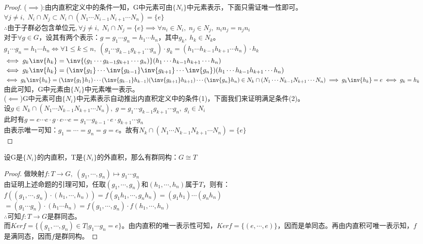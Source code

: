 \begin{proof}
($\implies$):由内直积定义中的条件一知，G中元素可由$\{N_i\}$中元素表示，下面只需证唯一性即可。\\
$\forall j\neq i,\; N_i\cap N_j\subset N_i\cap(N_1\cdots N_{i-1}N_{i+1}\cdots N_n)=\{e\}$\\
$\therefore \text{由于子群必包含单位元}, \forall j\neq i,\; N_i\cap N_j=\{e\}\implies \forall n_i\in N_i,\; n_j\in N_j,\; n_in_j=n_jn_i$\\
对于$\forall g\in G$，设其有两个表示：$g=g_1\cdots g_n=h_1\cdots h_n$，其中$g_k,\; h_k\in N_k$。\\
$g_1\cdots g_n=h_1\cdots h_n\iff \forall 1\leq k\leq n,\; (g_1\cdots g_{k-1}g_{k+1}\cdots g_n)\cdot g_k=(h_1\cdots h_{k-1}h_{k+1}\cdots h_n)\cdot h_k$\\
$\iff g_k\inv{h_k} =\inv{(g_1\cdots g_{k-1}g_{k+1}\cdots g_n)}(h_1\cdots h_{k-1}h_{k+1}\cdots h_n)$\\$\iff g_k\inv{h_k}=(\inv{g_1}\cdots \inv{g_{k-1}}\inv{g_{k+1}}\cdots \inv{g_n})(h_1\cdots h_{k-1}h_{k+1}\cdots h_n)$\\
$\iff g_k\inv{h_k}=(\inv{g_1}h_1)\cdots(\inv{g_{k-1}}h_{k-1})(\inv{g_{k+1}}h_{k+1})\cdots (\inv{g_n}h_n)\in N_k\cap(N_1\cdots N_{k-1}N_{k+1}\cdots N_n)\implies g_k\inv{h_k}=e\iff g_k=h_k$\\
由此可知，G中元素由$\{N_i\}$中元素唯一表示。\\
($\impliedby$)G中元素可由$\{N_i\}$中元素表示自动推出内直积定义中的条件(1)，下面我们来证明满足条件(2)。\\
设$g\in N_k\cap(N_1\cdots N_{k-1}N_{k+1}\cdots N_n),\; g=g_1\cdots g_{k-1}g_{k+1}\cdots g_n,\; g_i\in N_i$\\
此时有$g=e\cdots e\cdot g \cdot e\cdots e=g_1\cdots g_{k-1}\cdot e\cdot g_{k+1}\cdots g_n$\\
由表示唯一可知：$g_1=\cdots =g_n=g=e$。故有$N_k\cap(N_1\cdots N_{k-1}N_{k+1}\cdots N_n)=\{e\}$\\
\end{proof}
设G是$\{N_i\}$的内直积，T是$\{N_i\}$的外直积，那么有群同构：$G\cong T$
\begin{proof}
做映射$f\colon T\to G ,\; (g_1,\cdots ,g_n)\mapsto g_1\cdots g_n$\\
由证明上述命题的引理可知，任取$(g_1,\cdots ,g_n)$和$(h_1,\cdots ,h_n)$属于$T$，则有：\\
$f((g_1,\cdots ,g_n)\cdot (h_1,\cdots ,h_n))=f(g_1h_1,\cdots ,g_nh_n)=(g_1h_1)\cdots (g_nh_n)$\\$=(g_1\cdots g_n)\cdot (h_1\cdots h_n)=f(g_1,\cdots ,g_n)\cdot f(h_1,\cdots ,h_n)$\\
$\therefore$可知$f\colon T\to G$是群同态。\\
而$Kerf=\{(g_1,\cdots ,g_n)\in T|g_1\cdots g_n=e\}$。由内直积的唯一表示性可知，$Kerf=\{(e,\cdots,e)\}$，因而是单同态。再由内直积可唯一表示知，$f$是满同态，因而$f$是群同构。
\end{proof}

